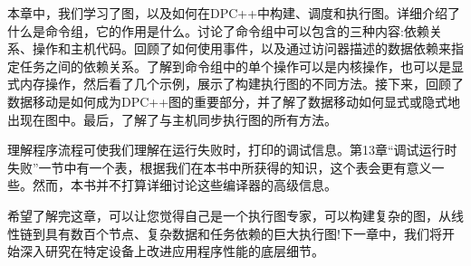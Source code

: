 本章中，我们学习了图，以及如何在DPC++中构建、调度和执行图。详细介绍了什么是命令组，它的作用是什么。讨论了命令组中可以包含的三种内容:依赖关系、操作和主机代码。回顾了如何使用事件，以及通过访问器描述的数据依赖来指定任务之间的依赖关系。了解到命令组中的单个操作可以是内核操作，也可以是显式内存操作，然后看了几个示例，展示了构建执行图的不同方法。接下来，回顾了数据移动是如何成为DPC++图的重要部分，并了解了数据移动如何显式或隐式地出现在图中。最后，了解了与主机同步执行图的所有方法。\par

理解程序流程可使我们理解在运行失败时，打印的调试信息。第13章“调试运行时失败”一节中有一个表，根据我们在本书中所获得的知识，这个表会更有意义一些。然而，本书并不打算详细讨论这些编译器的高级信息。\par

希望了解完这章，可以让您觉得自己是一个执行图专家，可以构建复杂的图，从线性链到具有数百个节点、复杂数据和任务依赖的巨大执行图!下一章中，我们将开始深入研究在特定设备上改进应用程序性能的底层细节。\par


\newpage







